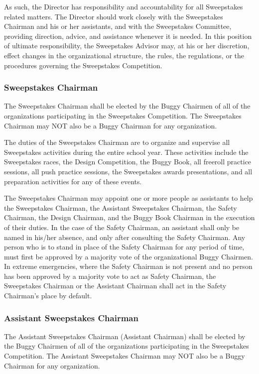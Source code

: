 \documentclass[openany]{book}
\begin{document}
As such, the Director has responsibility and accountability for all Sweepstakes related matters. The Director should work closely with the Sweepstakes Chairman and his or her assistants, and with the Sweepstakes Committee, providing direction, advice, and assistance whenever it is needed. In this position of ultimate responsibility, the Sweepstakes Advisor may, at his or her discretion, effect changes in the organizational structure, the rules, the regulations, or the procedures governing the Sweepstakes Competition.

\subsubsection{Sweepstakes Chairman}

The Sweepstakes Chairman shall be elected by the Buggy Chairmen of all of the organizations participating in the Sweepstakes Competition. The Sweepstakes Chairman may NOT also be a Buggy Chairman for any organization.

The duties of the Sweepstakes Chairman are to organize and supervise all Sweepstakes activities during the entire school year. These activities include the Sweepstakes races, the Design Competition, the Buggy Book, all freeroll practice sessions, all push practice sessions, the Sweepstakes awards presentations, and all preparation activities for any of these events.

The Sweepstakes Chairman may appoint one or more people as assistants to help the Sweepstakes Chairman, the Assistant Sweepstakes Chairman, the Safety Chairman, the Design Chairman, and the Buggy Book Chairman in the execution of their duties. In the case of the Safety Chairman, an assistant shall only be named in his/her absence, and only after consulting the Safety Chairman. Any person who is to stand in place of the Safety Chairman for any period of time, must first be approved by a majority vote of the organizational Buggy Chairmen. In extreme emergencies, where the Safety Chairman is not present and no person has been approved by a majority vote to act as Safety Chairman, the Sweepstakes Chairman or the Assistant Chairman shall act in the Safety Chairman's place by default.

\subsubsection{Assistant Sweepstakes Chairman}
The Assistant Sweepstakes Chairman (Assistant Chairman) shall be elected by the Buggy Chairmen of all of the organizations participating in the Sweepstakes Competition. The Assistant Sweepstakes Chairman may NOT also be a Buggy Chairman for any organization.
\end{document}
